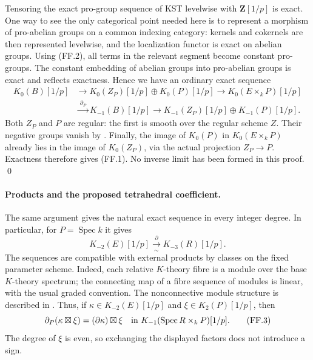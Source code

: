 Tensoring the exact pro-group sequence of KST levelwise with
$\mathbf Z[1/p]$ is exact.  One way to see the only categorical point
needed here is to represent a morphism of pro-abelian groups on a common
indexing category: kernels and cokernels are then represented levelwise,
and the localization functor is exact on abelian groups.  Using (FF.2),
all terms in the relevant segment become constant pro-groups.  The
constant embedding of abelian groups into pro-abelian groups is exact
and reflects exactness.  Hence we have an ordinary exact sequence
\begin{align*}
 K_0(B)[1/p]&\longrightarrow
 K_0(Z_P)[1/p]\oplus K_0(P)[1/p]
 \longrightarrow K_0(E\times_kP)[1/p]\\
 &\xrightarrow{\ \partial_P\ }K_{-1}(B)[1/p]
 \longrightarrow K_{-1}(Z_P)[1/p]\oplus K_{-1}(P)[1/p].
\end{align*}
Both $Z_P$ and $P$ are regular: the first is smooth over the regular
scheme $Z$.  Their negative groups vanish by
\citet[Proposition 6.8(b), pp.~362--363]{D_ThomasonTrobaugh1990}.
Finally, the image of $K_0(P)$ in $K_0(E\times_kP)$ already lies in the
image of $K_0(Z_P)$, via the actual projection $Z_P\to P$.  Exactness
therefore gives (FF.1).  No inverse limit has been formed in this proof.
\qed

\paragraph{Products and the proposed tetrahedral coefficient.}
The same argument gives the natural exact sequence in every integer
degree.  In particular, for $P=\operatorname{Spec}k$ it gives
\[
 K_{-2}(E)[1/p]\xrightarrow[\sim]{\ \partial\ }
 K_{-3}(R)[1/p].
\]
The sequences are compatible with external products by classes on the
fixed parameter scheme.  Indeed, each relative $K$-theory fibre is a
module over the base $K$-theory spectrum; the connecting map of a fibre
sequence of modules is linear, with the usual graded convention.
The nonconnective module structure is described in
\citet[Section 6.5, pp.~360--361]{D_ThomasonTrobaugh1990}.
Thus, if $\kappa\in K_{-2}(E)[1/p]$ and $\xi\in K_2(P)[1/p]$, then
\begin{equation}
 \partial_P(\kappa\boxtimes\xi)
   = (\partial\kappa)\boxtimes\xi
   \quad\hbox{in }K_{-1}(\operatorname{Spec}R\times_kP)[1/p].
 \tag{FF.3}
\end{equation}
The degree of $\xi$ is even, so exchanging the displayed factors does
not introduce a sign.

